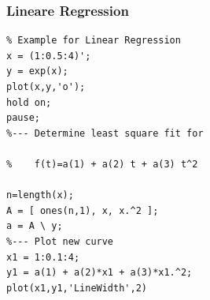 %
% 
\begin{frame}[fragile]\frametitle{Lineare Regression}
\begin{lstlisting}
% Example for Linear Regression 
x = (1:0.5:4)';
y = exp(x);
plot(x,y,'o');
hold on;
pause;
%--- Determine least square fit for

%    f(t)=a(1) + a(2) t + a(3) t^2

n=length(x);
A = [ ones(n,1), x, x.^2 ];
a = A \ y;
%--- Plot new curve
x1 = 1:0.1:4;
y1 = a(1) + a(2)*x1 + a(3)*x1.^2;
plot(x1,y1,'LineWidth',2)
\end{lstlisting}
\end{frame}




